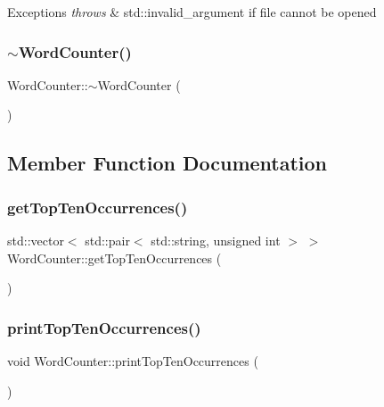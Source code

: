 \begin{DoxyExceptions}{Exceptions}
{\em throws} & std\+::invalid\+\_\+argument if file cannot be opened \\
\hline
\end{DoxyExceptions}
\mbox{\label{class_word_counter_ad0703060b084d90e36bb7b506c7eff94}} 
\subsubsection{\texorpdfstring{$\sim$\+Word\+Counter()}{~WordCounter()}}
{\footnotesize\ttfamily Word\+Counter\+::$\sim$\+Word\+Counter (\begin{DoxyParamCaption}{ }\end{DoxyParamCaption})}



\subsection{Member Function Documentation}
\mbox{\label{class_word_counter_a0d81dc009206dbbdddfd0fc290252855}} 
\subsubsection{\texorpdfstring{get\+Top\+Ten\+Occurrences()}{getTopTenOccurrences()}}
{\footnotesize\ttfamily std\+::vector$<$ std\+::pair$<$ std\+::string, unsigned int $>$ $>$ Word\+Counter\+::get\+Top\+Ten\+Occurrences (\begin{DoxyParamCaption}{ }\end{DoxyParamCaption})}

\mbox{\label{class_word_counter_a29d681756dec9d102141c6c8a136561d}} 
\subsubsection{\texorpdfstring{print\+Top\+Ten\+Occurrences()}{printTopTenOccurrences()}}
{\footnotesize\ttfamily void Word\+Counter\+::print\+Top\+Ten\+Occurrences (\begin{DoxyParamCaption}{ }\end{DoxyParamCaption})}



